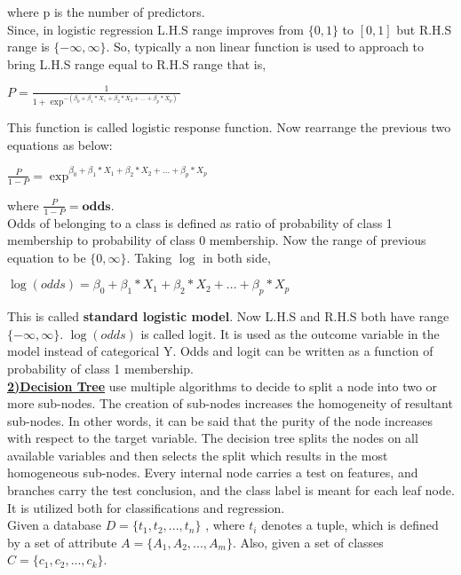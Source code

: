 \documentclass[11pt]{article}
\begin{document}
where p is the number of predictors.\\
Since, in logistic regression L.H.S range improves from $\{0,1\} $ to $[0,1]$ but R.H.S range is $\{-\infty,\infty\}$. So, typically a non linear function is used to approach to bring L.H.S range equal to R.H.S range that is,
\begin{center}
$P=\displaystyle\frac{1}{1+\exp^{-(\beta_{0}+\beta_{1}*X_{1}+\beta_{2}*X_{2}+...+\beta_{p}*X_{p})}}$
\end{center}
This function is called logistic response function. Now rearrange the previous two equations as below:\\
\begin{center}
$\displaystyle\frac{P}{1-P}=\displaystyle\exp^{\beta_{0}+\beta_{1}*X_{1}+\beta_{2}*X_{2}+...+\beta_{p}*X_{p}}$
\end{center}
where $\displaystyle\frac{P}{1-P}=\textbf{odds}$.\\
Odds of belonging to a class is defined as ratio of probability of class 1 membership to probability of class 0 membership. Now the range of previous equation to be $\{0,\infty\}$. Taking $\log$ in both side,
\begin{center}
$\log(odds)=\beta_{0}+\beta_{1}*X_{1}+\beta_{2}*X_{2}+...+\beta_{p}*X_{p}$
\end{center} 
This is called \textbf{standard logistic model}. Now L.H.S and R.H.S both have range $\{-\infty,\infty\}$. $\log(odds)$ is called logit. It is used as the outcome variable in the model instead of categorical Y. Odds and logit can be written as a function of probability of class 1 membership.\\
\underline{\textbf{2)Decision Tree}} use multiple algorithms to decide to split a node into two or more
sub-nodes. The creation of sub-nodes increases the homogeneity of resultant sub-nodes. In other words, it can be said that the purity of the node increases with respect to the target
variable. The decision tree splits the nodes on all available variables and then selects the split which results in the most homogeneous sub-nodes. Every internal node carries a test on features, and
branches carry the test conclusion, and the class label
is meant for each leaf node. It is utilized both for
classifications and regression.\\
Given a database $D = \{t_{1},t_{2},...,t_{n}\}$ , where $t_{i}$ denotes a tuple, which is
defined by a set of attribute $A = \{A_{1}, A_{2},..., A_{m}\}$. Also, given a set of classes
$C = \{c_{1}, c_{2},...,c_{k}\}$.\\
\end{document}
